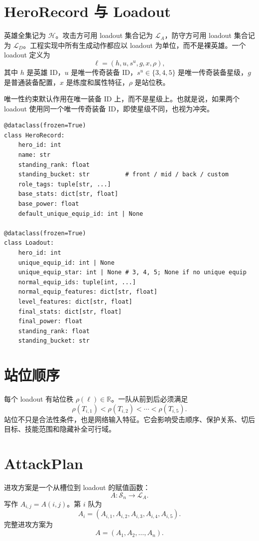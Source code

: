 \documentclass[UTF8,12pt,openany]{ctexbook}
\newcommand{\Hcal}{\mathcal{H}}
\newcommand{\Lcal}{\mathcal{L}}
\newcommand{\Scal}{\mathcal{S}}
\begin{document}
\section{HeroRecord 与 Loadout}
英雄全集记为 $\Hcal$。攻击方可用 loadout 集合记为 $\Lcal_A$，防守方可用 loadout 集合记为 $\Lcal_D$。工程实现中所有生成动作都应以 loadout 为单位，而不是裸英雄。一个 loadout 定义为
\begin{equation}
\ell=(h,u,s^u,g,x,\rho),
\end{equation}
其中 $h$ 是英雄 ID，$u$ 是唯一传奇装备 ID，$s^u\in\{3,4,5\}$ 是唯一传奇装备星级，$g$ 是普通装备配置，$x$ 是练度和属性特征，$\rho$ 是站位秩。

唯一性约束默认作用在唯一装备 ID 上，而不是星级上。也就是说，如果两个 loadout 使用同一个唯一传奇装备 ID，即使星级不同，也视为冲突。

\begin{lstlisting}[caption={HeroRecord 与 Loadout 数据结构}]
@dataclass(frozen=True)
class HeroRecord:
    hero_id: int
    name: str
    standing_rank: float
    standing_bucket: str          # front / mid / back / custom
    role_tags: tuple[str, ...]
    base_stats: dict[str, float]
    base_power: float
    default_unique_equip_id: int | None

@dataclass(frozen=True)
class Loadout:
    hero_id: int
    unique_equip_id: int | None
    unique_equip_star: int | None # 3, 4, 5; None if no unique equip
    normal_equip_ids: tuple[int, ...]
    normal_equip_features: dict[str, float]
    level_features: dict[str, float]
    final_stats: dict[str, float]
    final_power: float
    standing_rank: float
    standing_bucket: str
\end{lstlisting}

\section{站位顺序}
每个 loadout 有站位秩 $\rho(\ell)\in\mathbb{R}$。一队从前到后必须满足
\begin{equation}
\rho(T_{i,1}) < \rho(T_{i,2}) < \cdots < \rho(T_{i,5}).
\end{equation}
站位不只是合法性条件，也是网络输入特征。它会影响受击顺序、保护关系、切后目标、技能范围和隐藏补全可行域。

\section{AttackPlan}
进攻方案是一个从槽位到 loadout 的赋值函数：
\begin{equation}
A:\Scal_n\rightarrow \Lcal_A.
\end{equation}
写作 $A_{i,j}=A(i,j)$。第 $i$ 队为
\begin{equation}
A_i=(A_{i,1},A_{i,2},A_{i,3},A_{i,4},A_{i,5}).
\end{equation}
完整进攻方案为
\begin{equation}
A=(A_1,A_2,\ldots,A_n).
\end{equation}
\end{document}
